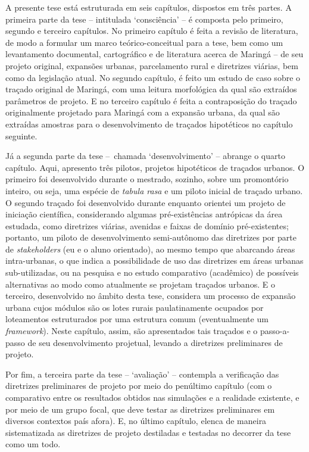 \documentclass[12pt, a4paper]{book} %
\begin{document}
            A presente tese está estruturada em seis capítulos, dispostos em três partes. A primeira parte da tese – intitulada `consciência' – é composta pelo primeiro,  segundo e terceiro capítulos. No primeiro capítulo é feita a revisão de literatura, de modo a formular um marco teórico-conceitual para a tese, bem como um levantamento documental, cartográfico e de literatura acerca de Maringá – de seu projeto original, expansões urbanas, parcelamento rural e diretrizes viárias, bem como da legislação atual. No segundo capítulo, é feito um estudo de caso sobre o traçado original de Maringá, com uma leitura morfológica da qual são extraídos parâmetros de projeto. E no terceiro capítulo é feita a contraposição do traçado originalmente projetado para Maringá com a expansão urbana, da qual são extraídas amostras para o desenvolvimento de traçados hipotéticos no capítulo seguinte.

            Já a segunda parte da tese – chamada `desenvolvimento' – abrange o quarto capítulo. Aqui, apresento três pilotos, projetos hipotéticos de traçados urbanos. O primeiro foi desenvolvido durante o mestrado, sozinho, sobre um promontório inteiro, ou seja, uma espécie de \textit{tabula rasa} e um piloto inicial de traçado urbano. O segundo traçado foi desenvolvido durante enquanto orientei um projeto de iniciação científica, considerando algumas pré-existências antrópicas da área estudada, como diretrizes viárias, avenidas e faixas de domínio pré-existentes; portanto, um piloto de desenvolvimento semi-autônomo das diretrizes por parte de \textit{stakeholders} (eu e o aluno orientado), ao mesmo tempo que abarcando áreas intra-urbanas, o que indica a possibilidade de uso das diretrizes em áreas urbanas sub-utilizadas, ou na pesquisa e no estudo comparativo (acadêmico) de possíveis alternativas ao modo como atualmente se projetam traçados urbanos. E o terceiro, desenvolvido no âmbito desta tese, considera um processo de expansão urbana cujos módulos são os lotes rurais paulatinamente ocupados por loteamentos estruturados por uma estrutura comum (eventualmente um \textit{framework}). Neste capítulo, assim, são apresentados tais traçados e o passo-a-passo de seu desenvolvimento projetual, levando a diretrizes preliminares de projeto.

            Por fim, a terceira parte da tese – `avaliação' – contempla a verificação das diretrizes preliminares de projeto por meio do penúltimo capítulo (com o comparativo entre os resultados obtidos nas simulações e a realidade existente, e por meio de um grupo focal, que deve testar as diretrizes preliminares em diversos contextos país afora). E, no último capítulo, elenca de maneira sistematizada as diretrizes de projeto destiladas e testadas no decorrer da tese como um todo.
\end{document}
